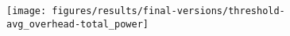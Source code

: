 \documentclass[10pt, conference, compsocconf]{IEEEtran}
\begin{document}
\begin{figure}[H]\texttt{[image: figures/results/final-versions/threshold-avg\_overhead-total\_power]}\end{figure}



\label{results}



%
%



%
%
\end{document}
